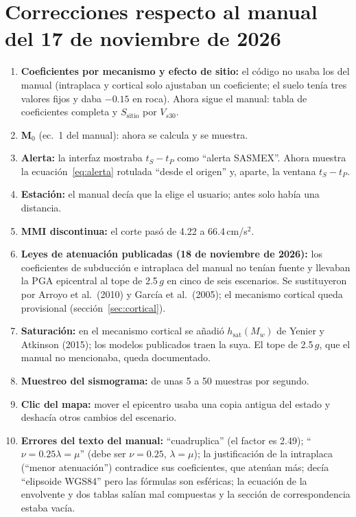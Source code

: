 \documentclass[11pt,a4paper]{article}
\begin{document}
\section{Correcciones respecto al manual del 17 de noviembre de 2026}

\begin{enumerate}
  \item \textbf{Coeficientes por mecanismo y efecto de sitio:} el código no usaba los del manual
        (intraplaca y cortical solo ajustaban un coeficiente; el suelo tenía tres valores fijos y daba
        $-0.15$ en roca). Ahora sigue el manual: tabla de coeficientes completa y $S_{\mathrm{sitio}}$
        por $V_{s30}$.
  \item \textbf{M$_0$} (ec.~1 del manual): ahora se calcula y se muestra.
  \item \textbf{Alerta:} la interfaz mostraba $t_S - t_P$ como ``alerta SASMEX''. Ahora muestra la
        ecuación~\eqref{eq:alerta} rotulada ``desde el origen'' y, aparte, la ventana $t_S - t_P$.
  \item \textbf{Estación:} el manual decía que la elige el usuario; antes solo había una distancia.
  \item \textbf{MMI discontinua:} el corte pasó de 4.22 a 66.4\,cm/s$^2$.
  \item \textbf{Leyes de atenuación publicadas (18 de noviembre de 2026):} los coeficientes de
        subducción e intraplaca del manual no tenían fuente y llevaban la PGA epicentral al tope de
        2.5\,$g$ en cinco de seis escenarios. Se sustituyeron por Arroyo et al.\ (2010) y García et
        al.\ (2005); el mecanismo cortical queda provisional (sección~\ref{sec:cortical}).
  \item \textbf{Saturación:} en el mecanismo cortical se añadió $h_{\mathrm{sat}}(M_w)$ de Yenier y
        Atkinson (2015); los modelos publicados traen la suya. El tope de 2.5\,$g$, que el manual no
        mencionaba, queda documentado.
  \item \textbf{Muestreo del sismograma:} de unas 5 a 50 muestras por segundo.
  \item \textbf{Clic del mapa:} mover el epicentro usaba una copia antigua del estado y deshacía otros
        cambios del escenario.
  \item \textbf{Errores del texto del manual:} ``cuadruplica'' (el factor es 2.49);
        ``$\nu = 0.25\lambda = \mu$'' (debe ser $\nu = 0.25$, $\lambda = \mu$); la justificación de la
        intraplaca (``menor atenuación'') contradice sus coeficientes, que atenúan más; decía ``elipsoide
        WGS84'' pero las fórmulas son esféricas; la ecuación de la envolvente y dos tablas salían mal
        compuestas y la sección de correspondencia estaba vacía.
\end{enumerate}
\end{document}
